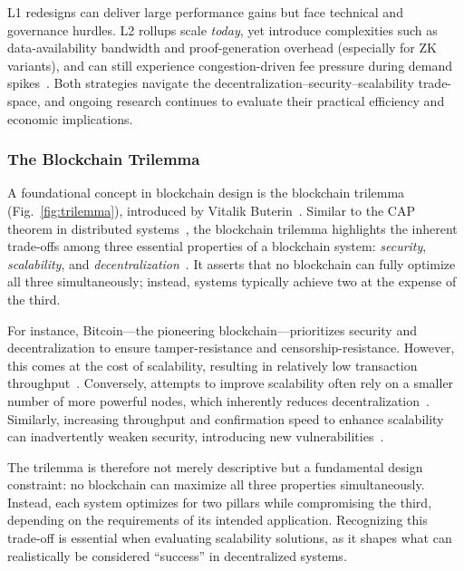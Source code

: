 \vspace{12pt}

L1 redesigns can deliver large performance gains but face technical and governance hurdles. L2 rollups scale \emph{today}, yet introduce complexities such as data-availability bandwidth and proof-generation overhead (especially for ZK variants), and can still experience congestion-driven fee pressure during demand spikes~\cite{habib2025bottlenecks,ethScalingDocs}. Both strategies navigate the decentralization–security–scalability trade-space, and ongoing research continues to evaluate their practical efficiency and economic implications.

\vspace{12pt}
\subsubsection{The Blockchain Trilemma}
\vspace{12pt}

A foundational concept in blockchain design is the blockchain trilemma (Fig.~\ref{fig:trilemma}), introduced by Vitalik Buterin~\cite{buterin2014ethereum}. Similar to the CAP theorem in distributed systems~\cite{gilbert2002brewer}, the blockchain trilemma highlights the inherent trade-offs among three essential properties of a blockchain system: \textit{security}, \textit{scalability}, and \textit{decentralization}~\cite{zhou2020solutions}. It asserts that no blockchain can fully optimize all three simultaneously; instead, systems typically achieve two at the expense of the third.

\vspace{12pt}
For instance, Bitcoin—the pioneering blockchain—prioritizes security and decentralization to ensure tamper-resistance and censorship-resistance. However, this comes at the cost of scalability, resulting in relatively low transaction throughput~\cite{khan2021challenges}. Conversely, attempts to improve scalability often rely on a smaller number of more powerful nodes, which inherently reduces decentralization~\cite{chen2024survey}. Similarly, increasing throughput and confirmation speed to enhance scalability can inadvertently weaken security, introducing new vulnerabilities~\cite{chen2024survey}.

\vspace{12pt}
The trilemma is therefore not merely descriptive but a fundamental design constraint: no blockchain can maximize all three properties simultaneously. Instead, each system optimizes for two pillars while compromising the third, depending on the requirements of its intended application. Recognizing this trade-off is essential when evaluating scalability solutions, as it shapes what can realistically be considered “success” in decentralized systems.

